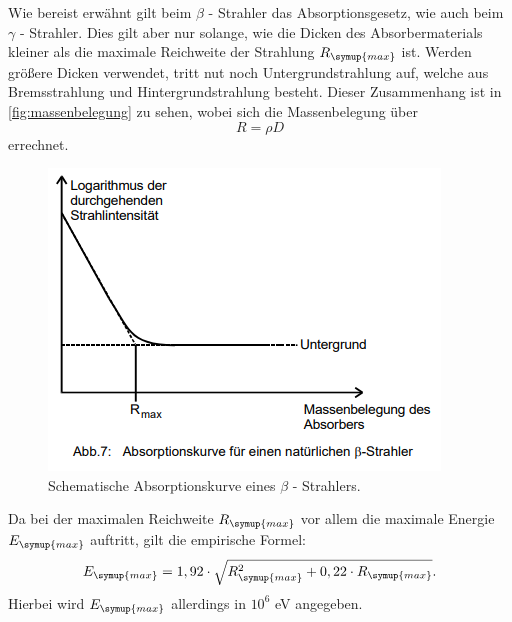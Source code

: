 Wie bereist erwähnt gilt beim $\beta$ - Strahler das Absorptionsgesetz, wie auch beim $\gamma$ - Strahler. Dies gilt aber nur solange, wie die 
Dicken des Absorbermaterials kleiner als die maximale Reichweite der Strahlung $R_{\symup{max}}$ ist. Werden größere Dicken verwendet, 
tritt nut noch Untergrundstrahlung auf, welche aus Bremsstrahlung und Hintergrundstrahlung besteht. Dieser Zusammenhang ist in \autoref{fig:massenbelegung}
zu sehen, wobei sich die Massenbelegung über 
\begin{equation}
    \label{eqn:massenbelegung}
    R = \rho D
\end{equation}
errechnet. 
\begin{figure}
        \centering
        \includegraphics[width=\textwidth]{content/absorption.png}
        \caption{Schematische Absorptionskurve eines $\beta$ - Strahlers\cite[241]{V704}.}
        \label{fig:massenbelegung}
    \end{figure}
Da bei der maximalen Reichweite $R_{\symup{max}}$ vor allem die maximale Energie $E_{\symup{max}}$ auftritt, gilt die empirische Formel:
\begin{equation}
    \label{eqn:max_energie}    
    E_{\symup{max}} = 1,92 \cdot \sqrt{R_{\symup{max}}^2 + 0,22 \cdot R_{\symup{max}}}.
\end{equation}
Hierbei wird $E_{\symup{max}}$ allerdings in $10^6$ eV angegeben.